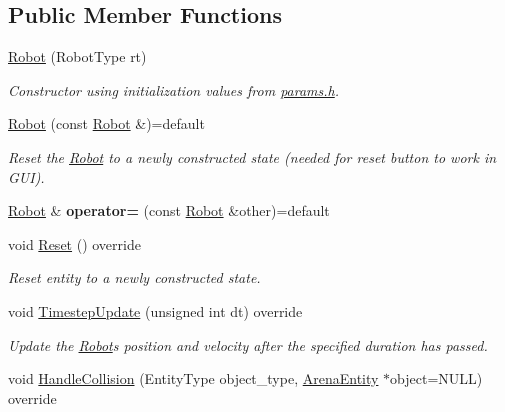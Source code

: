 \subsection*{Public Member Functions}
\begin{DoxyCompactItemize}
\item 
\hyperlink{classRobot_a3475f306d3a9b7090e31a12399260055}{Robot} (Robot\+Type rt)\hypertarget{classRobot_a3475f306d3a9b7090e31a12399260055}{}\label{classRobot_a3475f306d3a9b7090e31a12399260055}

\begin{DoxyCompactList}\small\item\em Constructor using initialization values from \hyperlink{params_8h}{params.\+h}. \end{DoxyCompactList}\item 
\hyperlink{classRobot_a4fd835c7c44337d31d9fd09921d29908}{Robot} (const \hyperlink{classRobot}{Robot} \&)=default\hypertarget{classRobot_a4fd835c7c44337d31d9fd09921d29908}{}\label{classRobot_a4fd835c7c44337d31d9fd09921d29908}

\begin{DoxyCompactList}\small\item\em Reset the \hyperlink{classRobot}{Robot} to a newly constructed state (needed for reset button to work in G\+UI). \end{DoxyCompactList}\item 
\hyperlink{classRobot}{Robot} \& {\bfseries operator=} (const \hyperlink{classRobot}{Robot} \&other)=default\hypertarget{classRobot_a69f171c4965ac4523cd95e2191405d37}{}\label{classRobot_a69f171c4965ac4523cd95e2191405d37}

\item 
void \hyperlink{classRobot_af597fd14927d2cd5308ded62f4e54e29}{Reset} () override\hypertarget{classRobot_af597fd14927d2cd5308ded62f4e54e29}{}\label{classRobot_af597fd14927d2cd5308ded62f4e54e29}

\begin{DoxyCompactList}\small\item\em Reset entity to a newly constructed state. \end{DoxyCompactList}\item 
void \hyperlink{classRobot_ae790462f8782efcfd26082eedec30ed5}{Timestep\+Update} (unsigned int dt) override
\begin{DoxyCompactList}\small\item\em Update the \hyperlink{classRobot}{Robot}\textquotesingle{}s position and velocity after the specified duration has passed. \end{DoxyCompactList}\item 
void \hyperlink{classRobot_a4fc6b01fec869b559197d8e4b9686249}{Handle\+Collision} (Entity\+Type object\+\_\+type, \hyperlink{classArenaEntity}{Arena\+Entity} $\ast$object=N\+U\+LL) override\hypertarget{classRobot_a4fc6b01fec869b559197d8e4b9686249}{}\label{classRobot_a4fc6b01fec869b559197d8e4b9686249}


\end{DoxyCompactItemize}
